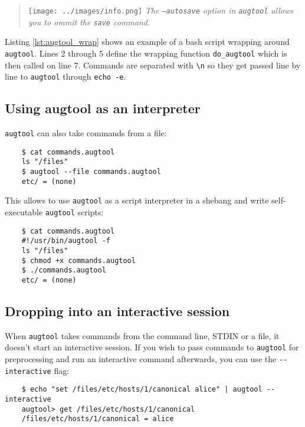 
\begin{quote}
\texttt{[image: ../images/info.png]} \emph{The \texttt{--autosave} option in \texttt{augtool} allows you to ommit the \texttt{save} command.}
\end{quote}

Listing \ref{lst:augtool_wrap} shows an example of a bash script wrapping around \verb!augtool!. Lines 2 through 5 define the wrapping function \verb!do_augtool! which is then called on line 7. Commands are separated with \verb!\n! so they get passed line by line to \verb!augtool! through \verb!echo -e!.


\subsection{Using augtool as an interpreter}

\verb!augtool! can also take commands from a file:

 

\begin{verbatim}
    $ cat commands.augtool
    ls "/files"
    $ augtool --file commands.augtool
    etc/ = (none)
\end{verbatim}

This allows to use \verb!augtool! as a script interpreter in a shebang and write self-executable \verb!augtool! scripts:

\begin{verbatim}
    $ cat commands.augtool
    #!/usr/bin/augtool -f
    ls "/files"
    $ chmod +x commands.augtool
    $ ./commands.augtool
    etc/ = (none)
\end{verbatim}

\subsection{Dropping into an interactive session}

When \verb!augtool! takes commands from the command line, STDIN or a file, it doesn't start an interactive session. If you wish to pass commands to \verb!augtool! for preprocessing and run an interactive command afterwards, you can use the \verb!--interactive! flag:

  

\begin{verbatim}
    $ echo "set /files/etc/hosts/1/canonical alice" | augtool --interactive
    augtool> get /files/etc/hosts/1/canonical
    /files/etc/hosts/1/canonical = alice
\end{verbatim}

